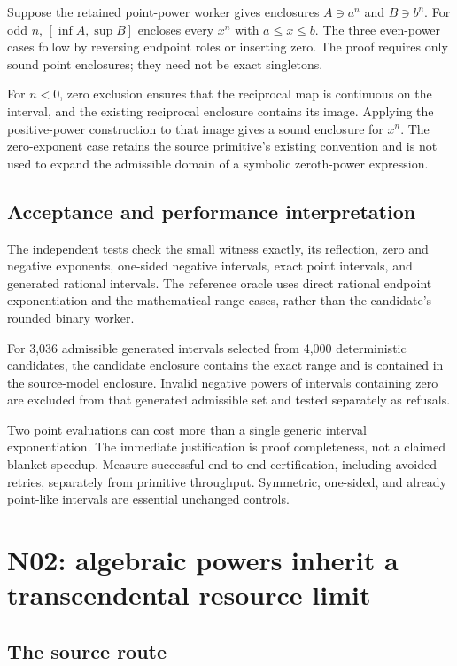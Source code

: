 \documentclass[11pt,a4paper]{article}
\begin{document}
Suppose the retained point-power worker gives enclosures $A\ni a^n$ and $B\ni b^n$. For odd $n$, $[\inf A,\sup B]$ encloses every $x^n$ with $a\le x\le b$. The three even-power cases follow by reversing endpoint roles or inserting zero. The proof requires only sound point enclosures; they need not be exact singletons.

For $n<0$, zero exclusion ensures that the reciprocal map is continuous on the interval, and the existing reciprocal enclosure contains its image. Applying the positive-power construction to that image gives a sound enclosure for $x^n$. The zero-exponent case retains the source primitive's existing convention and is not used to expand the admissible domain of a symbolic zeroth-power expression.

\subsection{Acceptance and performance interpretation}

The independent tests check the small witness exactly, its reflection, zero and negative exponents, one-sided negative intervals, exact point intervals, and generated rational intervals. The reference oracle uses direct rational endpoint exponentiation and the mathematical range cases, rather than the candidate's rounded binary worker.

For 3,036 admissible generated intervals selected from 4,000 deterministic candidates, the candidate enclosure contains the exact range and is contained in the source-model enclosure. Invalid negative powers of intervals containing zero are excluded from that generated admissible set and tested separately as refusals.

Two point evaluations can cost more than a single generic interval exponentiation. The immediate justification is proof completeness, not a claimed blanket speedup. Measure successful end-to-end certification, including avoided retries, separately from primitive throughput. Symmetric, one-sided, and already point-like intervals are essential unchanged controls.

\section{N02: algebraic powers inherit a transcendental resource limit}
\subsection{The source route}
\end{document}
